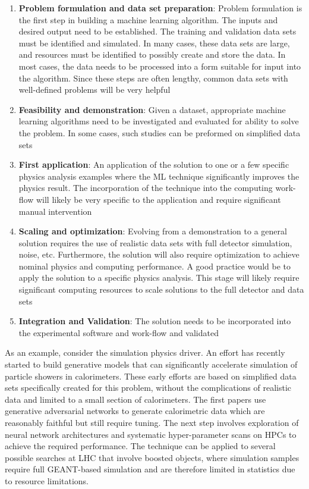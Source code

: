 \begin{enumerate}
 \item \textbf{Problem formulation and data set preparation}: Problem formulation is the first step in building a machine learning algorithm. The inputs and desired output need to be established. The training and validation data sets must be identified and simulated. In many cases, these data sets are large, and resources must be identified to possibly create and store the data. In most cases, the data needs to be processed into a form suitable for input into the algorithm. Since these steps are often lengthy, common data sets with well-defined problems will be very helpful
 \item \textbf{Feasibility and demonstration}: Given a dataset, appropriate machine learning algorithms need to be investigated and evaluated for ability to solve the problem. In some cases, such studies can be preformed on simplified data sets
 \item \textbf{First application}: An application of the solution to one or a few specific physics analysis examples where the ML technique significantly improves the physics result. The incorporation of the technique into the computing work-flow will likely be very specific to the application and require significant manual intervention
 \item \textbf{Scaling and optimization}: Evolving from a demonstration to a general solution requires the use of realistic data sets with full detector simulation, noise, etc. Furthermore, the solution will also require optimization to achieve nominal physics and computing performance. A good practice would be to apply the solution to a specific physics analysis. This stage will likely require significant computing resources to scale solutions to the full detector and data sets
 \item \textbf{Integration and Validation}: The solution needs to be incorporated into the experimental software and work-flow and validated
\end{enumerate}

As an example, consider the simulation physics driver. An effort has recently started to build generative models that can significantly accelerate simulation of particle showers in calorimeters. These early efforts are based on simplified data sets specifically created for this problem, without the complications of realistic data and limited to a small section of calorimeters. The first papers\cite{Paganini:2017hrr} use generative adversarial networks to generate calorimetric data which are reasonably faithful but still require tuning. The next step involves exploration of neural network architectures and systematic hyper-parameter scans on HPCs to achieve the required performance. The technique can be applied to several possible searches at LHC that involve boosted objects, where simulation samples require full GEANT-based simulation and are therefore limited in statistics due to resource limitations.

